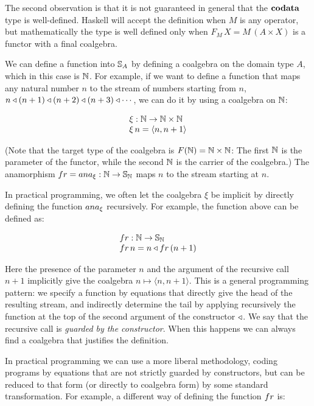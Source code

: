 The second observation is that it is not guaranteed in general that the $\mathbf{codata}$ type is well-defined.
Haskell will accept the definition when $M$ is any operator, but mathematically the type is well defined only when $F_M\,X = M\,(A\times X)$ is a functor with a final coalgebra.


We can define a function into $\mathbb{S}_{A}$ by defining a coalgebra on the domain type $A$, which in this case is $\mathbb{N}$.
For example, if we want to define a function that maps any natural number $n$ to the stream of numbers starting from $n$, $n\triangleleft (n+1) \triangleleft (n+2) \triangleleft (n+3) \triangleleft \cdots$, we can do it by using a coalgebra on $\mathbb{N}$:

$$
\begin{array}{l}
\xi : \mathbb{N} \rightarrow \mathbb{N}\times \mathbb{N}\\
\xi\,n = \langle n,n+1\rangle
\end{array}
$$

(Note that the target type of the coalgebra is $F(\mathbb{N}) = \mathbb{N}\times\mathbb{N}$: The first $\mathbb{N}$ is the parameter of the functor, while the second $\mathbb{N}$ is the carrier of the coalgebra.)
The anamorphism $\sfr = \ana{\xi}:\nat \rightarrow \stream{\nat}$ maps $n$ to the stream starting at $n$.

In practical programming, we often let the coalgebra $\xi$ be implicit by directly defining the function $\ana{\xi}$ recursively.
For example, the function above can be defined as:

$$
\begin{array}{l}
\sfr: \nat \rightarrow \stream{\nat}\\
\sfr\,n = n \scons \sfr\,(n+1)
\end{array}
$$

Here the presence of the parameter $n$ and the argument of the recursive call $n+1$ implicitly give the coalgebra $n \mapsto \langle n, n+1\rangle$.
This is a general programming pattern: we specify a function by equations that directly give the head of the resulting stream, and indirectly determine the tail
 by applying recursively the function at the top of the second argument of the constructor ${\triangleleft}$.
We say that the recursive call is {\em guarded by the constructor}.
When this happens we can always find a coalgebra that justifies the definition.

In practical programming we can use a more liberal methodology, coding programs by equations that are not strictly guarded by constructors, but can be reduced to that form (or directly to coalgebra form) by some standard transformation.
For example, a different way of defining the function $\sfr$ is:

